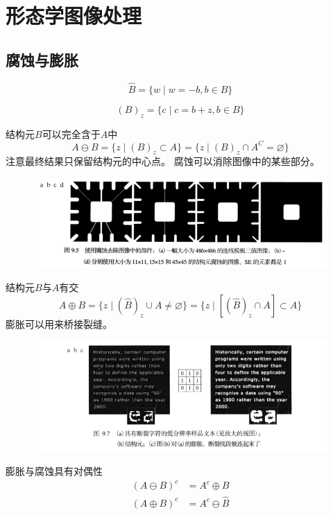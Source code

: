 
\section{形态学图像处理}
\subsection{腐蚀与膨胀}
\begin{definition}[反射]
\[\hat{B}=\{w\mid w=-b,b\in B\}\]
\end{definition}
\begin{definition}[平移]
\[(B)_z=\{c\mid c=b+z,b\in B\}\]
\end{definition}
\begin{definition}[腐蚀]
结构元$B$可以完全含于$A$中
\[A\ominus B=\{z\mid(B)_z\subset A\}=\{z\mid(B)_z\cap A^C=\varnothing\}\]
注意最终结果只保留结构元的中心点。
腐蚀可以消除图像中的某些部分。
\end{definition}
\begin{figure}[H]
\centering
\includegraphics[width=0.9\linewidth]{fig/erosion.png}
\end{figure}
\begin{definition}[膨胀]
结构元$B$与$A$有交
\[A\oplus B=\{z\mid(\hat{B})_z\cup A\ne\varnothing\}=\{z\mid [(\hat{B})_z\cap A]\subset A\}\]
膨胀可以用来桥接裂缝。
\end{definition}
\begin{figure}[H]
\centering
\includegraphics[width=0.9\linewidth]{fig/dilation.png}
\end{figure}

膨胀与腐蚀具有对偶性
\[\begin{aligned}
(A\ominus B)^c &= A^c\oplus B\\
(A\oplus B)^c &= A^c\ominus \hat{B}
\end{aligned}\]

